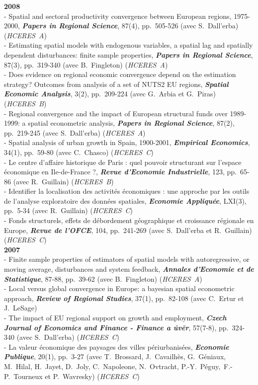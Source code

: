 \documentclass[a4paper,12pt]{article}
\begin{document}
\noindent \textbf{2008}  \smallskip \\ 
- Spatial and sectoral productivity convergence between European regions, 1975-2000, \textit{\textbf{Papers in Regional Science}}, 87(4), pp.~505-526 (avec S.~Dall'erba) (\textit{HCERES~A}) \\
 - Estimating spatial models with endogenous variables, a spatial lag and spatially dependent disturbances: finite sample properties, \textit{\textbf{Papers in Regional Science}}, 87(3), pp.~319-340 (avec B.~Fingleton) (\textit{HCERES~A}) \\
- Does evidence on regional economic convergence depend on the estimation strategy? Outcomes from analysis of a set of NUTS2 EU regions, \textit{\textbf{Spatial Economic Analysis}}, 3(2), pp.~209-224 (avec G.~Arbia et G.~Piras) (\textit{HCERES~B}) \\
- Regional convergence and the impact of European structural funds over 1989-1999: a spatial econometric analysis, \textit{\textbf{Papers in Regional Science}}, 87(2), pp.~219-245 (avec S.~Dall'erba) (\textit{HCERES~A}) \\
- Spatial analysis of urban growth in Spain, 1900-2001, \textit{\textbf{Empirical Economics}}, 34(1), pp.~59-80 (avec C.~Chasco) (\textit{HCERES~C}) \\
- Le centre d'affaire historique de Paris : quel pouvoir structurant sur l'espace économique en Ile-de-France ?, \textit{\textbf{Revue d'Economie Industrielle}}, 123, pp.~65-86 (avec R.~Guillain) (\textit{HCERES~B}) \\
 - Identifier la localisation des activités économiques : une approche par les outils de l'analyse exploratoire des données spatiales, \textit{\textbf{Economie Appliquée}}, LXI(3), pp.~5-34 (avec R.~Guillain) (\textit{HCERES~C}) \\
- Fonds structurels, effets de débordement géographique et croissance régionale en Europe, \textit{\textbf{Revue de l'OFCE}}, 104, pp.~241-269 (avec S.~Dall'erba et R.~Guillain) (\textit{HCERES~C}) \\

\noindent \textbf{2007}  \smallskip \\ 
- Finite sample properties of estimators of spatial models with autoregressive, or moving average, disturbances and system feedback, \textit{\textbf{Annales d'Economie et de Statistique}}, 87-88, pp.~39-62 (avec B.~Fingleton) (\textit{HCERES~A}) \\	
 - Local versus global convergence in Europe: a bayesian spatial econometric approach, \textit{\textbf{Review of Regional Studies}}, 37(1), pp.~82-108 (avec C.~Ertur et J.~LeSage) \\
 - The impact of EU regional support on growth and employment, \textit{\textbf{Czech Journal of Economics and Finance - Finance a úvěr}}, 57(7-8), pp.~324-340 (avec S.~Dall'erba) (\textit{HCERES~C}) \\
 - La valeur économique des paysages des villes périurbanisées, \textit{\textbf{Economie Publique}}, 20(1), pp.~3-27 (avec T.~Brossard, J.~Cavailhès, G.~Géniaux, M.~Hilal, H.~Jayet, D.~Joly, C.~Napoleone, N.~Ovtracht, \hbox{P.-Y.~Péguy},\hbox{ F.-P.~Tourneux} et P.~Wavresky) (\textit{HCERES~C}) \\
		
\end{document}
